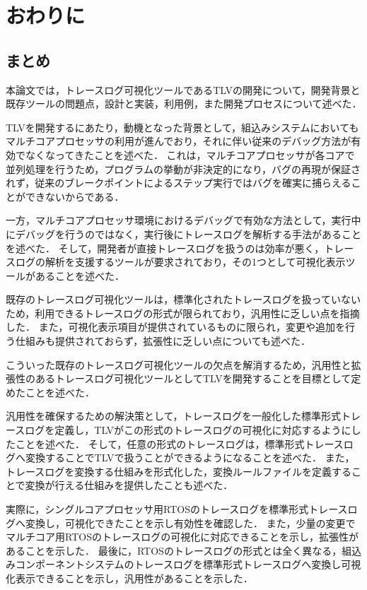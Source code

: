 \chapter{おわりに}

\section{まとめ}

本論文では，トレースログ可視化ツールであるTLVの開発について，開発背景と既存ツールの問題点，設計と実装，利用例，また開発プロセスについて述べた．

TLVを開発するにあたり，動機となった背景として，組込みシステムにおいてもマルチコアプロセッサの利用が進んでおり，それに伴い従来のデバッグ方法が有効でなくなってきたことを述べた．
これは，マルチコアプロセッサが各コアで並列処理を行うため，プログラムの挙動が非決定的になり，バグの再現が保証されず，従来のブレークポイントによるステップ実行ではバグを確実に捕らえることができないからである．

一方，マルチコアプロセッサ環境におけるデバッグで有効な方法として，実行中にデバッグを行うのではなく，実行後にトレースログを解析する手法があることを述べた．
そして，開発者が直接トレースログを扱うのは効率が悪く，トレースログの解析を支援するツールが要求されており，その1つとして可視化表示ツールがあることを述べた．

既存のトレースログ可視化ツールは，標準化されたトレースログを扱っていないため，利用できるトレースログの形式が限られており，汎用性に乏しい点を指摘した．
また，可視化表示項目が提供されているものに限られ，変更や追加を行う仕組みも提供されておらず，拡張性に乏しい点についても述べた．

こういった既存のトレースログ可視化ツールの欠点を解消するため，汎用性と拡張性のあるトレースログ可視化ツールとしてTLVを開発することを目標として定めたことを述べた．

汎用性を確保するための解決策として，トレースログを一般化した標準形式トレースログを定義し，TLVがこの形式のトレースログの可視化に対応するようにしたことを述べた．
そして，任意の形式のトレースログは，標準形式トレースログへ変換することでTLVで扱うことができるようになることを述べた．
また，トレースログを変換する仕組みを形式化した，変換ルールファイルを定義することで変換が行える仕組みを提供したことも述べた．

実際に，シングルコアプロセッサ用RTOSのトレースログを標準形式トレースログへ変換し，可視化できたことを示し有効性を確認した．
また，少量の変更でマルチコア用RTOSのトレースログの可視化に対応できることを示し，拡張性があることを示した．
最後に，RTOSのトレースログの形式とは全く異なる，組込みコンポーネントシステムのトレースログを標準形式トレースログへ変換し可視化表示できることを示し，汎用性があることを示した．

